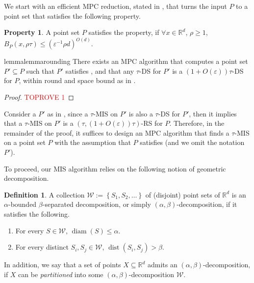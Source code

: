 \documentclass[11pt,letterpaper]{article}
\theoremstyle{plain}
\theoremstyle{definition}
\newtheorem{definition}[theorem]{Definition}
\newtheorem{property}[theorem]{Property}
\theoremstyle{remark}
\DeclareMathOperator{\dist}{dist}
\DeclareMathOperator{\diam}{diam}
\renewcommand{\epsilon}{\ensuremath{\varepsilon}}
\let\epsilon\varepsilon
\begin{document}
We start with an efficient MPC reduction, stated in , that turns the input $P$ to a point set that satisfies the following property.
\begin{property}
    \label{prop:packing}
    A point set $P$ satisfies the property, if $\forall x \in \mathbb{R}^d$, $\rho \geq 1$, $B_P(x, \rho\tau) \leq (\epsilon^{-1}\rho d)^{O(d)}$.
\end{property}
\begin{restatable}{lemma}{lemmarounding}
    \label{lemma:rounding}
    There exists an MPC algorithm that computes a point set $P' \subseteq P$ such that $P'$ satisfies ,
    and that any $\tau$-DS for $P'$ is a $(1 + O(\epsilon))\tau$-DS for $P$,
    within round and space bound as in .
\end{restatable}
    \begin{proof}\textcolor{red}{TOPROVE 1}\end{proof}

Consider a $P'$ as in ,
since a $\tau$-MIS on $P'$ is also a $\tau$-DS for $P'$,
then it implies that a $\tau$-MIS on $P'$ is a $(\tau, (1 + O(\epsilon))\tau)$-RS for $P$.
Therefore,  in the remainder of the proof,
it suffices to design an MPC algorithm that finds a $\tau$-MIS on a point set $P$ with the assumption that $P$ satisfies  (and we omit the notation $P'$).








To proceed, our MIS algorithm relies on the following notion of geometric decomposition.











\begin{definition}
    \label{def:decomposition}
    A collection $\mathcal{W}:=\left\{S_{1}, S_{2}, \ldots\right\}$  of (disjoint) point sets of $\mathbb{R}^{d}$ is an $\alpha$-bounded $\beta$-separated decomposition, or simply $(\alpha, \beta)$-decomposition, if it satisfies the following.
    \begin{enumerate}
        \item For every $S\in \mathcal{W}$, $\diam(S)\leq \alpha$.
        \item For every distinct $S_{i}, S_{j}\in \mathcal{W}$, $\dist(S_{i}, S_{j})>\beta$.
    \end{enumerate}
    In addition, we say that a set of points $X\subseteq \mathbb{R}^{d}$ admits an $(\alpha, \beta)$-decomposition, if $X$ can be \emph{partitioned} into some $(\alpha, \beta)$-decomposition $\mathcal{W}$.
\end{definition}
\end{document}
